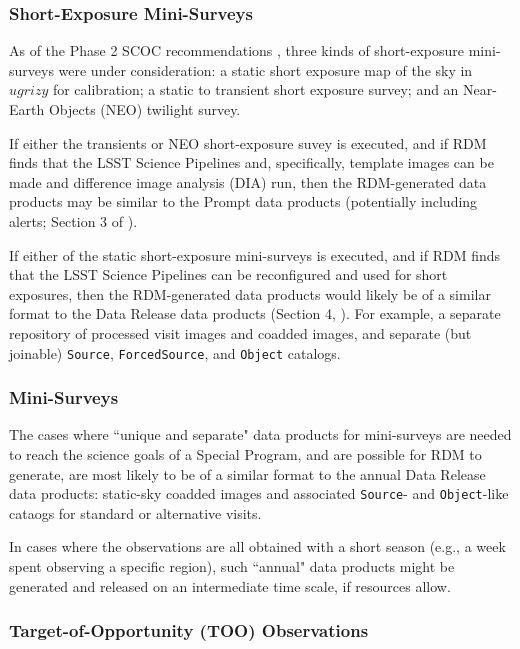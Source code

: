 \subsubsection{Short-Exposure Mini-Surveys}

As of the Phase 2 SCOC recommendations , three kinds of 
short-exposure mini-surveys were under consideration: 
a static short exposure map of the sky in $ugrizy$ for calibration; 
a static to transient short exposure survey; and 
an Near-Earth Objects (NEO) twilight survey.

If either the transients or NEO short-exposure suvey is executed, and if 
RDM finds that the LSST Science Pipelines and, specifically, template images 
can be made and difference image analysis (DIA) run, then the RDM-generated 
data products may be similar to the Prompt data products (potentially 
including alerts; Section 3 of ).

If either of the static short-exposure mini-surveys is executed, and if 
RDM finds that the LSST Science Pipelines can be reconfigured and used 
for short exposures, then the RDM-generated data products would likely be 
of a similar format to the Data Release data products 
(Section 4, ).
For example, a separate repository of processed visit images and coadded 
images, and separate (but joinable) {\tt Source}, {\tt ForcedSource}, and 
{\tt Object} catalogs.


\subsubsection{Mini-Surveys}

The cases where ``unique and separate" data products for mini-surveys are 
needed to reach the science goals of a Special Program, and are possible for 
RDM to generate, are most likely to be of a similar format to the annual 
Data Release data products: static-sky coadded images and associated 
{\tt Source}- and {\tt Object}-like cataogs for standard or alternative visits.

In cases where the observations are all obtained with a short season 
(e.g., a week spent observing a specific region), such ``annual" 
data products might be generated and released on an intermediate time scale, 
if resources allow.


\subsubsection{Target-of-Opportunity (TOO) Observations}

